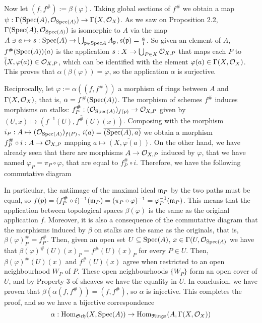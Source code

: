 \begin{sol}
	Now let $(f, f^{\#}):= \beta(\varphi)$. Taking global sections of $f^{\#}$ we obtain a map $\psi: \Gamma(\mathrm{Spec}(A), \mathcal{O}_{\mathrm{Spec}(A)}) \to \Gamma(X, \mathcal{O}_X)$. As we saw on Proposition 2.2, $\Gamma(\mathrm{Spec}(A), \mathcal{O}_{\mathrm{Spec}(A)})$ is isomorphic to $A$ via the map $A \ni a \mapsto s: \mathrm{Spec}(A) \to \bigcup_{\mathfrak{p} \in \mathrm{Spec}{A}} A_{\mathfrak{p}}, s(\mathfrak{p}) = \frac{a}{1}$. So given an element of $A$, $f^{\#}(\mathrm{Spec}(A))(a)$ is the application $s: X \to \bigcup_{P \in X} \mathcal{O}_{X,P}$ that maps each $P$ to $\overline(X, \varphi(a)) \in \mathcal{O}_{X,P}$, which can be identified with the element $\varphi(a) \in \Gamma(X, \mathcal{O}_X)$. This proves that $\alpha(\beta(\varphi)) = \varphi$, so the application $\alpha$ is surjective.

	Reciprocally, let $\varphi:= \alpha((f, f^{\#}))$ a morphism of rings between $A$ and $\Gamma(X, \mathcal{O}_X)$, that is, $\alpha = f^{\#}(\mathrm{Spec}(A))$. The morphism of schemes $f^{\#}$ induces morphisms on stalks: $f^{\#}_P: (\mathcal{O}_{\mathrm{Spec}(A)})_{f(p)} \to \mathcal{O}_{X,P}$ given by $\overline{(U,x)} \mapsto \overline{(f^{-1}(U), f^{\#}(U)(x))}$. Composing with the morphism $i_P: A \mapsto (\mathcal{O}_{\mathrm{Spec}(A)})_{f(P)}$, $i(a) = \overline{(\mathrm{Spec}(A), a)}$ we obtain a morphism $f^{\#}_P \circ i: A \to \mathcal{O}_{X,P}$ mapping $a \mapsto \overline{(X, \varphi(a))}$. On the other hand, we have already seen that there are morphisms $A \to \mathcal{O}_{X,P}$ induced by $\varphi$, that we have named $\varphi_P = \pi_P \circ \varphi$, that are equal to $f^{\#}_P \circ i$. Therefore, we have the following commutative diagram

	In particular, the antiimage of the maximal ideal $\mathfrak{m}_P$ by the two paths must be equal, so $f(p) = (f^{\#}_P \circ i)^{-1}(\mathfrak{m}_P) = (\pi_P \circ \varphi)^{-1} = \varphi_P^{-1}(\mathfrak{m}_P)$. This means that the application between topological spaces $\beta(\varphi)$ is the same as the original application $f$. Moreover, it is also a consequence of the commutative diagram that the morphisms induced by $\beta$ on stalks are the same as the originals, that is, $\beta(\varphi)^{\#}_P = f^{\#}_P$. Then, given an open set $U \subseteq \mathrm{Spec}(A)$, $x \in \Gamma(U, \mathcal{O}_{\mathrm{Spec}(A)}$ we have that $\beta(\varphi)^{\#}(U)(x)_P = f^{\#}(U)(x)_P$ for every $P \in U$. Then, $\beta(\varphi)^{\#}(U)(x)$ and $f^{\#}(U)(x)$ agree when restricted to an open neighbourhood $W_P$ of $P$. These open neighbourhoods $\{W_P\}$ form an open cover of $U$, and by Property 3 of sheaves we have the equality in $U$. In conclusion, we have proven that $\beta(\alpha(f,f^{\#})) = (f,f^{\#})$, so $\alpha$ is injective. This completes the proof, and so we have a bijective correspondence 
	\[
		\alpha: \mathrm{Hom}_{\mathfrak{Sch}}(X, \mathrm{Spec}(A)) \to \mathrm{Hom}_{\mathfrak{Rings}}(A,\Gamma(X, \mathcal{O}_X))
	\]
\end{sol}

